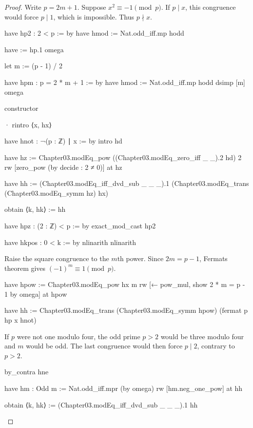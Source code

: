 \begin{proof}
  Write $p=2m+1$.
  Suppose $x^2\equiv-1\pmod p$.
  If $p\mid x$, this congruence would force $p\mid1$, which is impossible.
  Thus $p\nmid x$.

  \begin{lean}
    have hp2 : 2 < p := by
      have hmod := Nat.odd_iff.mp hodd

      have := hp.1
      omega

    let m := (p - 1) / 2

    have hpm : p = 2 * m + 1 := by
      have hmod := Nat.odd_iff.mp hodd
      dsimp [m]
      omega

    constructor

    · rintro ⟨x, hx⟩

      have hnot : ¬(p : ℤ) ∣ x := by
        intro hd

        have hz := Chapter03.modEq_pow ((Chapter03.modEq_zero_iff _ _).2 hd) 2
        rw [zero_pow (by decide : 2 ≠ 0)] at hz

        have hh := (Chapter03.modEq_iff_dvd_sub _ _ _).1
          (Chapter03.modEq_trans (Chapter03.modEq_symm hz) hx)

        obtain ⟨k, hk⟩ := hh

        have hpz : (2 : ℤ) < p := by
          exact_mod_cast hp2

        have hkpos : 0 < k := by
          nlinarith
        nlinarith
  \end{lean}

  Raise the square congruence to the $m$th power.
  Since $2m=p-1$, Fermat\textquotesingle s theorem gives $(-1)^m\equiv1\pmod p$.

  \begin{lean}
    have hpow := Chapter03.modEq_pow hx m
    rw [← pow_mul, show 2 * m = p - 1 by omega] at hpow

    have hh := Chapter03.modEq_trans (Chapter03.modEq_symm hpow) (fermat p hp x hnot)
  \end{lean}

  If $p$ were not one modulo four, the odd prime $p>2$ would be three modulo four and $m$ would be
  odd.
  The last congruence would then force $p\mid2$, contrary to $p>2$.

  \begin{lean}
    by_contra hne

    have hm : Odd m := Nat.odd_iff.mpr (by omega)
    rw [hm.neg_one_pow] at hh

    obtain ⟨k, hk⟩ := (Chapter03.modEq_iff_dvd_sub _ _ _).1 hh


\end{lean}
\end{proof}
